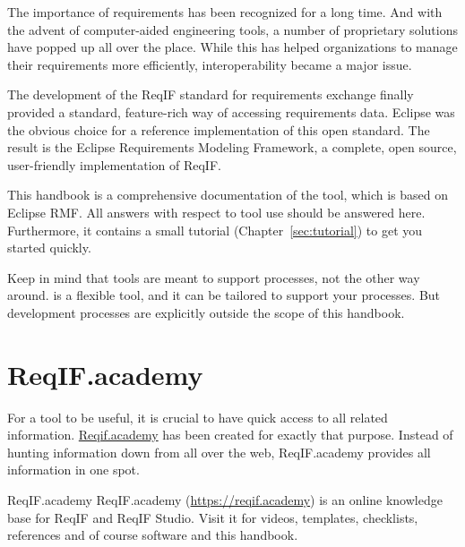 % 

The importance of requirements has been recognized for a long time.  And with the advent of computer-aided engineering tools, a number of proprietary solutions have popped up all over the place.  While this has helped organizations to manage their requirements more efficiently, interoperability became a major issue.

The development of the ReqIF standard for requirements exchange finally provided a standard, feature-rich way of accessing requirements data.  Eclipse was the obvious choice for a reference implementation of this open standard.  The result is the Eclipse Requirements Modeling Framework, a complete, open source, user-friendly implementation of ReqIF.

This handbook is a comprehensive documentation of the \pror{} tool, which is based on Eclipse RMF.  All answers with respect to tool use should be answered here.  Furthermore, it contains a small tutorial (Chapter~\ref{sec:tutorial}) to get you started quickly.

Keep in mind that tools are meant to support processes, not the other way around.  \pror{} is a flexible tool, and it can be tailored to support your processes.  But development processes are explicitly outside the scope of this handbook.

\section{ReqIF.academy}
\label{sec:reqif.academy}

For a tool to be useful, it is crucial to have quick access to all related information. \href{https://reqif.academy}{Reqif.academy} has been created for exactly that purpose. Instead of hunting information down from all over the web, ReqIF.academy provides all information in one spot. 

\begin{definition}{ReqIF.academy}
ReqIF.academy (\url{https://reqif.academy}) is an online knowledge base for ReqIF and ReqIF Studio. Visit it for videos, templates, checklists, references and of course software and this handbook.
\end{definition}


